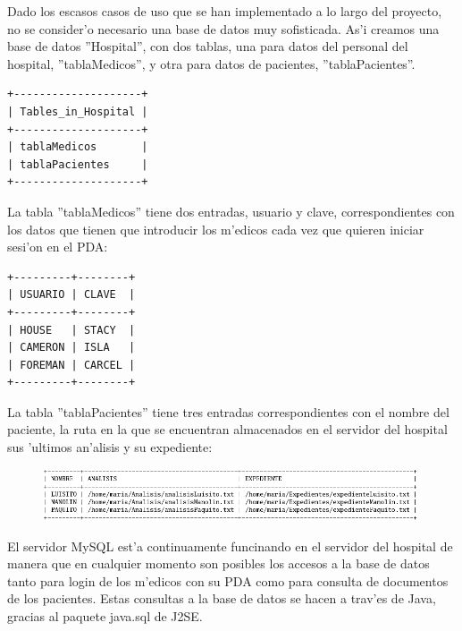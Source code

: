 Dado los escasos casos de uso que se han implementado a lo largo del proyecto, no se consider'o necesario una base de datos muy sofisticada. As'i creamos una base de datos ''Hospital'', con dos tablas, una para datos del personal del hospital, ''tablaMedicos'', y otra para datos de pacientes, ''tablaPacientes''.

\begin{verbatim}
+--------------------+
| Tables_in_Hospital |
+--------------------+
| tablaMedicos       |
| tablaPacientes     |
+--------------------+
\end{verbatim}

La tabla ''tablaMedicos'' tiene dos entradas, usuario y clave, correspondientes con los datos que tienen que introducir los m'edicos cada vez que quieren iniciar sesi'on en el PDA:

\begin{verbatim}
+---------+--------+
| USUARIO | CLAVE  |
+---------+--------+
| HOUSE   | STACY  |
| CAMERON | ISLA   |
| FOREMAN | CARCEL |
+---------+--------+
\end{verbatim}

La tabla ''tablaPacientes'' tiene tres entradas correspondientes con el nombre del paciente, la ruta en la que se encuentran almacenados en el servidor del hospital sus 'ultimos an'alisis y su expediente:

\begin{figure}[h]
	\begin{center}
		\includegraphics[scale=0.55]{bd.png}
     	\end{center}
\end{figure}

El servidor MySQL est'a continuamente funcinando en el servidor del hospital de manera que en cualquier momento son posibles los accesos a la base de datos tanto para login de los m'edicos con su PDA como para consulta de documentos de los pacientes. Estas consultas a la base de datos se hacen a trav'es de Java, gracias al paquete java.sql de J2SE.